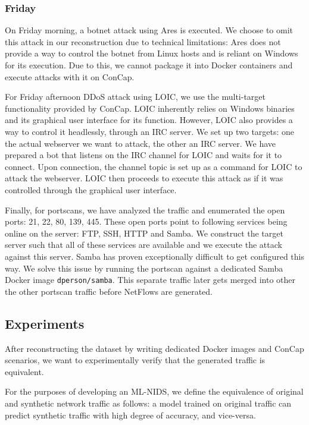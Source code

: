 \subsubsection{Friday}
On Friday morning, a botnet attack using Ares is executed. We choose to omit this attack in our reconstruction due to technical limitations: Ares does not provide a way to control the botnet from Linux hosts and is reliant on Windows for its execution. Due to this, we cannot package it into Docker containers and execute attacks with it on ConCap.

For Friday afternoon DDoS attack using LOIC, we use the multi-target functionality provided by ConCap. LOIC inherently relies on Windows binaries and its graphical user interface for its function. However, LOIC also provides a way to control it headlessly, through an IRC server. We set up two targets: one the actual webserver we want to attack, the other an IRC server. We have prepared a bot that listens on the IRC channel for LOIC and waits for it to connect. Upon connection, the channel topic is set up as a command for LOIC to attack the webserver. LOIC then proceeds to execute this attack as if it was controlled through the graphical user interface.

Finally, for portscans, we have analyzed the traffic and enumerated the open ports: 21, 22, 80, 139, 445. These open ports point to following services being online on the server: FTP, SSH, HTTP and Samba. We construct the target server such that all of these services are available and we execute the attack against this server. Samba has proven exceptionally difficult to get configured this way. We solve this issue by running the portscan against a dedicated Samba Docker image \texttt{dperson/samba}. This separate traffic later gets merged into other the other portscan traffic before NetFlows are generated.

\subsection{Experiments} \label{experiments}
After reconstructing the dataset by writing dedicated Docker images and ConCap scenarios, we want to experimentally verify that the generated traffic is equivalent.

For the purposes of developing an ML-NIDS, we define the equivalence of original and synthetic network traffic as follows: a model trained on original traffic can predict synthetic traffic with high degree of accuracy, and vice-versa. 


